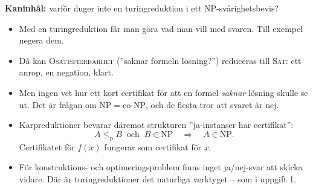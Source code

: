\documentclass[aspectratio=169,10pt]{beamer}
\newcommand{\rabbit}{\textcolor{warnorange}{\textbf{Kaninhål:}} }
\newcommand{\prob}[1]{\textsc{#1}}
\newcommand{\lep}{\le_{\mathrm{p}}}
\begin{document}
\begin{frame}{\rabbit varför duger inte en turingreduktion i ett NP-svårighetsbevis?}
  \begin{itemize}
    \item<1-> Med en turingreduktion får man göra vad man vill med svaren. Till exempel negera dem.
    \item<2-> Då kan \prob{Osatisfierbarhet} (''saknar formeln lösning?'') reduceras till \prob{Sat}: ett anrop, en negation, klart.
    \item<3-> Men ingen vet hur ett kort certifikat för att en formel \emph{saknar} lösning skulle se ut. Det är frågan om $\mathrm{NP}=\mathrm{co\text{-}NP}$, och de flesta tror att svaret är nej.
    \item<4-> Karpreduktioner bevarar däremot strukturen ''ja-instanser har certifikat'':
      \[A\lep B \ \text{ och }\ B\in\mathrm{NP} \quad\Longrightarrow\quad A\in\mathrm{NP}.\]
      Certifikatet för $f(x)$ fungerar som certifikat för $x$.
    \item<5-> För konstruktions- och optimeringsproblem finns inget ja/nej-svar att skicka vidare. Där är turingreduktioner det naturliga verktyget -- som i uppgift 1.
  \end{itemize}
\end{frame}
\end{document}
